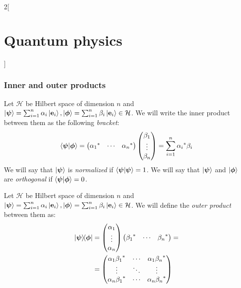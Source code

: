 \documentclass[../../../main_physics.tex]{subfiles}
\begin{document}
\begin{multicols}{2}[\section{Quantum physics}]
  \subsubsection{Inner and outer products}
  \begin{definition}
    Let $\mathcal{H}$ be Hilbert space of dimension $n$ and $\ket{\boldsymbol{\mathrm{\psi}}}=\sum_{i=1}^n\alpha_i\ket{\boldsymbol{\mathrm{e}}_i},\ket{\boldsymbol{\mathrm{\phi}}}=\sum_{i=1}^n\beta_i\ket{\boldsymbol{\mathrm{e}}_i}\in\mathcal{H}$. We will write the inner product between them as the following \emph{bracket}: $$\braket{\boldsymbol{\mathrm{\psi}}}{\boldsymbol{\mathrm{\phi}}}=
      \begin{pmatrix}
        {\alpha_1}^* & \cdots & {\alpha_n}^*
      \end{pmatrix}
      \begin{pmatrix}
        \beta_1 \\
        \vdots  \\
        \beta_n
      \end{pmatrix}=\sum_{i=1}^n{\alpha_i}^*\beta_i$$
    We will say that $\ket{\boldsymbol{\mathrm{\psi}}}$ is \emph{normalized} if $\braket{\boldsymbol{\mathrm{\psi}}}=1$. We will say that $\ket{\boldsymbol{\mathrm{\psi}}}$ and $\ket{\boldsymbol{\mathrm{\phi}}}$ are \emph{orthogonal} if $\braket{\boldsymbol{\mathrm{\psi}}}{\boldsymbol{\mathrm{\phi}}}=0$.
  \end{definition}
  \begin{definition}
    Let $\mathcal{H}$ be Hilbert space of dimension $n$ and $\ket{\boldsymbol{\mathrm{\psi}}}=\sum_{i=1}^n\alpha_i\ket{\boldsymbol{\mathrm{e}}_i},\ket{\boldsymbol{\mathrm{\phi}}}=\sum_{i=1}^n\beta_i\ket{\boldsymbol{\mathrm{e}}_i}\in\mathcal{H}$. We will define the \emph{outer product} between them as:
    \begin{align*}
      \dyad{\vf\psi}{\vf{\phi}} & =
      \begin{pmatrix}
        \alpha_1 \\
        \vdots   \\
        \alpha_n
      \end{pmatrix}\begin{pmatrix}
                     {\beta_1}^* & \cdots & {\beta_n}^*
                   \end{pmatrix}= \\
                                & =
      \begin{pmatrix}
        \alpha_1{\beta_1}^* & \cdots & \alpha_1{\beta_n}^* \\
        \vdots              & \ddots & \vdots              \\
        \alpha_n{\beta_1}^* & \cdots & \alpha_n{\beta_n}^* \\
      \end{pmatrix}
    \end{align*}
  \end{definition}

\end{multicols}
\end{document}
